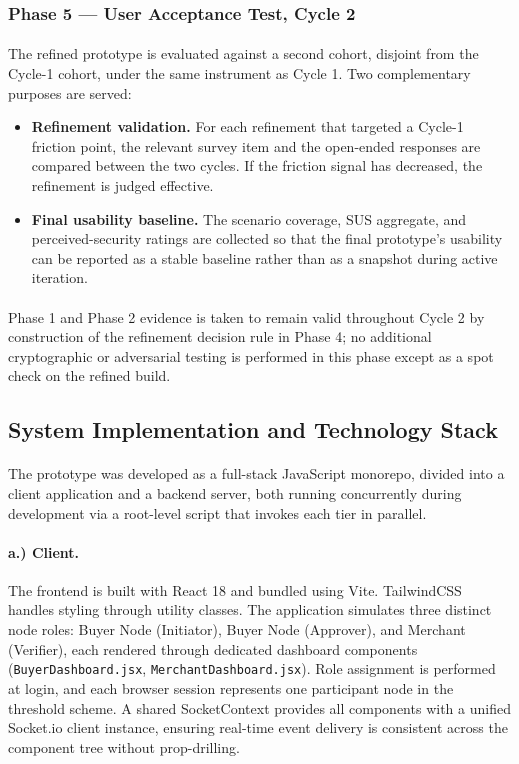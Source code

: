 \documentclass[a4paper]{scl-article}
\begin{document}
\subsubsection{Phase 5 --- User Acceptance Test, Cycle 2}
\label{sect:meth4_uat2}
\paragraph{}The refined prototype is evaluated against a second cohort, disjoint from the Cycle-1 cohort, under the same instrument as Cycle 1. Two complementary purposes are served:
\begin{itemize}
    \item \textbf{Refinement validation.} For each refinement that targeted a Cycle-1 friction point, the relevant survey item and the open-ended responses are compared between the two cycles. If the friction signal has decreased, the refinement is judged effective.
    \item \textbf{Final usability baseline.} The scenario coverage, SUS aggregate, and perceived-security ratings are collected so that the final prototype's usability can be reported as a stable baseline rather than as a snapshot during active iteration.
\end{itemize}
\paragraph{}Phase 1 and Phase 2 evidence is taken to remain valid throughout Cycle 2 by construction of the refinement decision rule in Phase 4; no additional cryptographic or adversarial testing is performed in this phase except as a spot check on the refined build.




\subsection{System Implementation and Technology Stack}
\label{sect:meth4_d}
\paragraph{}The prototype was developed as a full-stack JavaScript monorepo, divided into a client application and a backend server, both running concurrently during development via a root-level script that invokes each tier in parallel.

\paragraph{a.) Client.}
The frontend is built with React 18 and bundled using Vite. TailwindCSS handles styling through utility classes. The application simulates three distinct node roles: Buyer Node (Initiator), Buyer Node (Approver), and Merchant (Verifier), each rendered through dedicated dashboard components (\texttt{BuyerDashboard.jsx}, \texttt{MerchantDashboard.jsx}). Role assignment is performed at login, and each browser session represents one participant node in the threshold scheme. A shared SocketContext provides all components with a unified Socket.io client instance, ensuring real-time event delivery is consistent across the component tree without prop-drilling.
\end{document}
